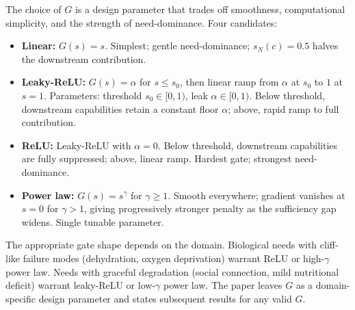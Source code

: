 \begin{remark}
\label{rem:gate_candidates}
The choice of $G$ is a design parameter that trades off
smoothness, computational simplicity, and the strength of
need-dominance.  Four candidates:
\begin{itemize}
\item \textbf{Linear:} $G(s) = s$.  Simplest; gentle
  need-dominance; $s_N(c) = 0.5$ halves the downstream
  contribution.
\item \textbf{Leaky-ReLU:} $G(s) = \alpha$ for $s \leq s_0$,
  then linear ramp from $\alpha$ at $s_0$ to $1$ at $s = 1$.
  Parameters: threshold $s_0 \in [0, 1)$, leak $\alpha \in [0, 1)$.
  Below threshold, downstream capabilities retain a constant
  floor $\alpha$; above, rapid ramp to full contribution.
\item \textbf{ReLU:} Leaky-ReLU with $\alpha = 0$.  Below
  threshold, downstream capabilities are fully suppressed; above,
  linear ramp.  Hardest gate; strongest need-dominance.
\item \textbf{Power law:} $G(s) = s^\gamma$ for $\gamma \geq 1$.
  Smooth everywhere; gradient vanishes at $s = 0$ for $\gamma > 1$,
  giving progressively stronger penalty as the sufficiency gap
  widens.  Single tunable parameter.
\end{itemize}
The appropriate gate shape depends on the domain.  Biological
needs with cliff-like failure modes (dehydration, oxygen
deprivation) warrant ReLU or high-$\gamma$ power law.  Needs with
graceful degradation (social connection, mild nutritional
deficit) warrant leaky-ReLU or low-$\gamma$ power law.  The paper
leaves $G$ as a domain-specific design parameter and states
subsequent results for any valid $G$.
\end{remark}

